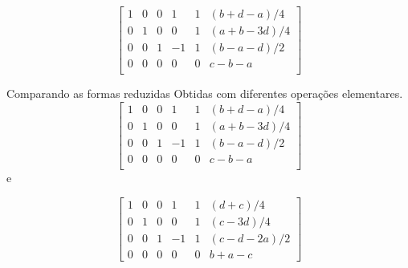 \documentclass{beamer}
\begin{document}
\begin{frame}
  $$
  \left[ \begin{array}{ccccc|c}
     1 & 0 & 0 & 1 & 1 & (b+d -a)/4 \\ 
     0 & 1 & 0 &0 & 1 & (a+b-3d)/4 \\
     0 & 0 & 1 & -1 & 1 & (b - a -d)/2 \\
     0 & 0 & 0 & 0 & 0 & c-b-a \\
    \end{array}\right]
  $$

\end{frame}

\begin{frame}{Comparando as formas reduzidas}
  Obtidas com diferentes operações elementares.
  $$
  \left[ \begin{array}{ccccc|c}
     1 & 0 & 0 & 1 & 1 & (b+d -a)/4 \\ 
     0 & 1 & 0 &0 & 1 & (a+b-3d)/4 \\
     0 & 0 & 1 & -1 & 1 & (b - a -d)/2 \\
     0 & 0 & 0 & 0 & 0 & c-b-a \\
    \end{array}\right]
  $$ e

 $$
  \left[ \begin{array}{ccccc|c}
     1 & 0 & 0 & 1 & 1 & (d+c)/4 \\ 
     0 & 1 & 0 & 0 & 1 & (c-3d)/4\\
    0 & 0 & 1 & -1 & 1 & (c -d-2a)/2 \\
     0 & 0 & 0 &0 & 0 & b +a -c 
  \end{array}\right]$$
\end{frame}
   
\end{document}
